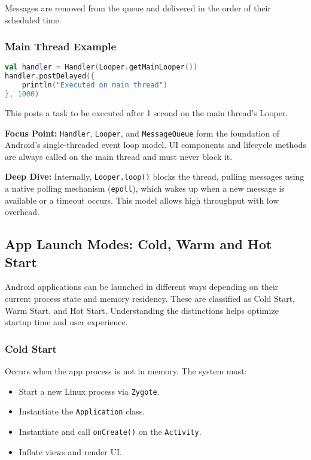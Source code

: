 \documentclass[a4paper,12pt]{article}
\begin{document}
Messages are removed from the queue and delivered in the order of their scheduled time.

\subsubsection{Main Thread Example}

\begin{lstlisting}[language=Kotlin]
val handler = Handler(Looper.getMainLooper())
handler.postDelayed({
    println("Executed on main thread")
}, 1000)
\end{lstlisting}

This posts a task to be executed after 1 second on the main thread’s Looper.

\textbf{Focus Point:} \texttt{Handler}, \texttt{Looper}, and \texttt{MessageQueue} form the foundation of Android's single-threaded event loop model. UI components and lifecycle methods are always called on the main thread and must never block it.

\textbf{Deep Dive:} Internally, \texttt{Looper.loop()} blocks the thread, pulling messages using a native polling mechanism (\texttt{epoll}), which wakes up when a new message is available or a timeout occurs. This model allows high throughput with low overhead.

\subsection{App Launch Modes: Cold, Warm and Hot Start}

Android applications can be launched in different ways depending on their current process state and memory residency. These are classified as Cold Start, Warm Start, and Hot Start. Understanding the distinctions helps optimize startup time and user experience.

\subsubsection{Cold Start}

Occurs when the app process is not in memory. The system must:

\begin{itemize}
  \item Start a new Linux process via \texttt{Zygote}.
  \item Instantiate the \texttt{Application} class.
  \item Instantiate and call \texttt{onCreate()} on the \texttt{Activity}.
  \item Inflate views and render UI.
\end{itemize}
\end{document}
